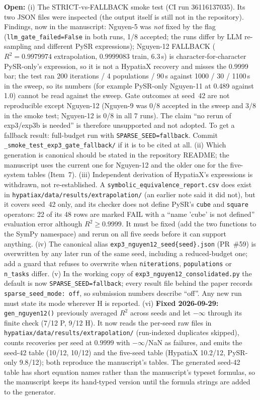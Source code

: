 \documentclass[11pt]{article}
\begin{document}
\textbf{Open:} (i) The STRICT-vs-FALLBACK smoke test (CI run 36116137035). Its two
JSON files were inspected (the output itself is still not in the repository). Findings, now in
the manuscript: Nguyen-5 was \emph{not} fixed by the flag (\texttt{llm\_gate\_failed=False}
in both runs, 1/8 accepted; the runs differ by LLM re-sampling and different PySR
expressions); Nguyen-12 FALLBACK ($R^2=0.9979974$ extrapolation, $0.9999083$ train, 6.3\,s) is
character-for-character PySR-only's expression, so it is not a HypatiaX recovery and misses the
0.9999 bar; the test ran 200 iterations / 4 populations / 90\,s against 1000 / 30 / 1100\,s in the
sweep, so its numbers (for example PySR-only Nguyen-11 at 0.489 against 1.0) cannot be read
against the sweep. Gate outcomes at seed~42 are not reproducible except Nguyen-12 (Nguyen-9 was
0/8 accepted in the sweep and 3/8 in the smoke test; Nguyen-12 is 0/8 in all 7 runs). The claim
``no rerun of exp3/exp3b is needed'' is therefore unsupported and not adopted. To get a
fallback result: full-budget run with \texttt{SPARSE\_SEED=fallback}. Commit
\texttt{\_smoke\_test\_exp3\_gate\_fallback/} if it is to be cited at all.
(ii) Which generation is canonical should be stated in the repository README; the
manuscript uses the current one for Nguyen-12 and the older one for the five-system tables
(Item~7). (iii) Independent derivation of HypatiaX's expressions is withdrawn, not
re-established. A \texttt{symbolic\_equivalence\_report.csv} does exist in
\texttt{hypatiax/data/results/extrapolation/} (an earlier note said it did not), but it covers
seed~42 only, and its checker does not define PySR's \texttt{cube} and \texttt{square}
operators: 22 of its 48 rows are marked FAIL with a ``name 'cube' is not defined'' evaluation
error although $R^2\ge0.9999$. It must be fixed (add the two functions to the SymPy namespace)
and rerun on all five seeds before it can support anything. (iv) The canonical alias
\texttt{exp3\_nguyen12\_seed\{seed\}.json} (PR~\#59) is overwritten by any later run of the same seed,
including a reduced-budget one; add a guard that refuses to overwrite when
\texttt{niterations}, \texttt{populations} or \texttt{n\_tasks} differ. (v) In the working copy of
\texttt{exp3\_nguyen12\_consolidated.py} the default is now \texttt{SPARSE\_SEED=fallback};
every result file behind the paper records \texttt{sparse\_seed\_mode: off}, so submission
numbers describe ``off''. Any new run must state its mode wherever H is reported.
(vi) \textbf{Fixed 2026-09-29:} \texttt{gen\_nguyen12()} previously averaged $R^2$ across
seeds and let $-\infty$ through its finite check (7/12 P, 9/12 H). It now reads the per-seed raw files in
\texttt{hypatiax/data/results/extrapolation/} (run-indexed duplicates skipped), counts recoveries per seed at
$0.9999$ with $-\infty$/NaN as failures, and emits the seed-42 table (10/12, 10/12) and the five-seed table
(HypatiaX 10.2/12, PySR-only 9.8/12); both reproduce the manuscript's tables. The generated seed-42 table has
short equation names rather than the manuscript's typeset formulas, so the manuscript keeps its hand-typed
version until the formula strings are added to the generator.
\end{document}
